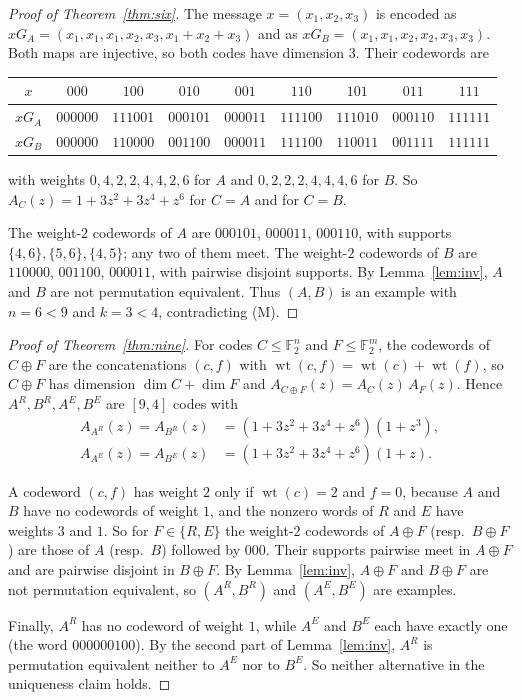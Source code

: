 \documentclass[11pt]{article}
\theoremstyle{plain}
\theoremstyle{definition}
\theoremstyle{remark}
\newcommand{\F}{\mathbb F}
\newcommand{\wt}{\operatorname{wt}}
\begin{document}
\begin{proof}[Proof of Theorem~\ref{thm:six}]
The message $x=(x_1,x_2,x_3)$ is encoded as $xG_A=(x_1,x_1,x_1,x_2,x_3,
x_1+x_2+x_3)$ and as $xG_B=(x_1,x_1,x_2,x_2,x_3,x_3)$. Both maps are injective, so
both codes have dimension $3$. Their codewords are
\begin{center}
\begin{tabular}{c|cccccccc}
$x$ & $000$ & $100$ & $010$ & $001$ & $110$ & $101$ & $011$ & $111$\\\hline
$xG_A$ & $000000$ & $111001$ & $000101$ & $000011$ & $111100$ & $111010$ &
  $000110$ & $111111$\\
$xG_B$ & $000000$ & $110000$ & $001100$ & $000011$ & $111100$ & $110011$ &
  $001111$ & $111111$
\end{tabular}
\end{center}
with weights $0,4,2,2,4,4,2,6$ for $A$ and $0,2,2,2,4,4,4,6$ for $B$. So
$A_C(z)=1+3z^2+3z^4+z^6$ for $C=A$ and for $C=B$.

The weight-$2$ codewords of $A$ are $000101$, $000011$, $000110$, with supports
$\{4,6\},\{5,6\},\{4,5\}$; any two of them meet. The weight-$2$ codewords of $B$ are
$110000$, $001100$, $000011$, with pairwise disjoint supports. By
Lemma~\ref{lem:inv}, $A$ and $B$ are not permutation equivalent. Thus $(A,B)$ is an
example with $n=6<9$ and $k=3<4$, contradicting (M).
\end{proof}

\begin{proof}[Proof of Theorem~\ref{thm:nine}]
For codes $C\le\F_2^n$ and $F\le\F_2^m$, the codewords of $C\oplus F$ are the
concatenations $(c,f)$ with $\wt(c,f)=\wt(c)+\wt(f)$, so $C\oplus F$ has dimension
$\dim C+\dim F$ and $A_{C\oplus F}(z)=A_C(z)\,A_F(z)$. Hence $A^R,B^R,A^E,B^E$ are
$[9,4]$ codes with
\begin{align*}
A_{A^R}(z)=A_{B^R}(z)&=(1+3z^2+3z^4+z^6)(1+z^3),\\
A_{A^E}(z)=A_{B^E}(z)&=(1+3z^2+3z^4+z^6)(1+z).
\end{align*}

A codeword $(c,f)$ has weight $2$ only if $\wt(c)=2$ and $f=0$, because $A$ and $B$
have no codewords of weight $1$, and the nonzero words of $R$ and $E$ have weights
$3$ and $1$. So for $F\in\{R,E\}$ the weight-$2$ codewords of $A\oplus F$ (resp.\
$B\oplus F$) are those of $A$ (resp.\ $B$) followed by $000$. Their supports
pairwise meet in $A\oplus F$ and are pairwise disjoint in $B\oplus F$. By
Lemma~\ref{lem:inv}, $A\oplus F$ and $B\oplus F$ are not permutation equivalent, so
$(A^R,B^R)$ and $(A^E,B^E)$ are examples.

Finally, $A^R$ has no codeword of weight $1$, while $A^E$ and $B^E$ each have
exactly one (the word $000000100$). By the second part of Lemma~\ref{lem:inv},
$A^R$ is permutation equivalent neither to $A^E$ nor to $B^E$. So neither
alternative in the uniqueness claim holds.
\end{proof}
\end{document}
